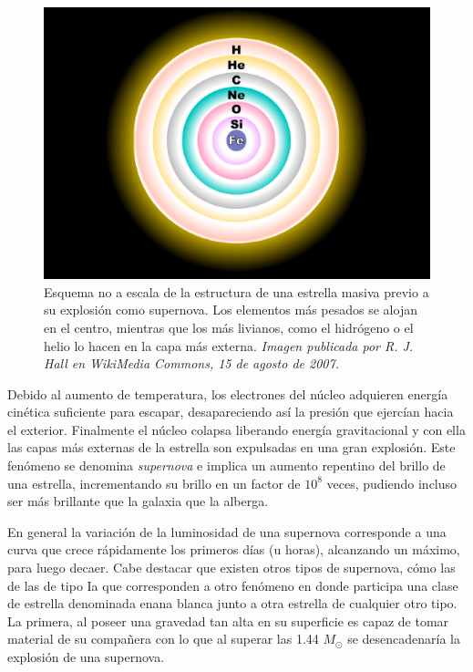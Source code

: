 \begin{figure}[h!]
\centering
\includegraphics[scale=.25]{images/sncore}
\caption{Esquema no a escala de la estructura de una estrella masiva previo a su explosi\'on como supernova. Los elementos m\'as pesados se alojan en el centro, mientras que  los m\'as livianos, como el hidr\'ogeno o el helio lo hacen en la capa m\'as externa. \textit{Imagen publicada por R. J. Hall en WikiMedia Commons, 15 de agosto de 2007.}}
\label{fig:f0}
\end{figure}


Debido al aumento de temperatura, los electrones del n\'ucleo adquieren energ\'ia cin\'etica suficiente para escapar, desapareciendo as\'i la presi\'on que ejerc\'ian hacia el exterior. Finalmente el n\'ucleo colapsa liberando energ\'ia gravitacional y con ella las capas m\'as externas de la estrella son expulsadas en una gran explosi\'on. Este fen\'omeno se denomina \textit{supernova} e implica un aumento repentino del brillo de una estrella, incrementando su brillo en un factor de $10^8$ veces, pudiendo incluso ser m\'as brillante que la galaxia que la alberga.
\bigskip

En general la variaci\'on de la luminosidad de una supernova corresponde a una curva que crece r\'apidamente los primeros d\'ias (u horas), alcanzando un m\'aximo, para luego decaer. Cabe destacar que existen otros tipos de supernova, c\'omo las de las de tipo Ia que corresponden a otro fen\'omeno en donde participa una clase de estrella denominada enana blanca junto a otra estrella de cualquier otro tipo. La primera, al poseer una gravedad tan alta en su superficie es capaz de tomar material de su compa\~nera con lo que al superar las 1.44 $M_{\odot}$ se desencadenar\'ia la explosi\'on de una supernova. 
\bigskip

